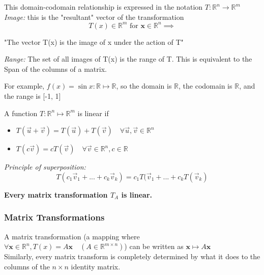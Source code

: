 \documentclass[12pt]{article} %
\newcommand{\R}{\mathbb{R}}
\begin{document}
This domain-codomain relationship is expressed in the notation $T: \R^n \to \R^m$\\

\emph{Image:} this is the "resultant" vector of the transformation 
$$T(x)\in \R^m \text{ for } \mathbf{x}\in \R^n \implies$$
\begin{center}
 "The vector T(x) is the image of x under the action of T"
\end{center}

\emph{Range:} The set of all images of T(x) is the range of T. This is equivalent to the Span of the columns of a matrix.

For example, $f(x) = \sin x : \R \mapsto \R$, so the domain is $\R$, the codomain is $\R$, and the range is [-1, 1]

A function $T : \R^n \mapsto \R^m$ is linear if
\begin{itemize}
	\item $T(\vec{u} + \vec{v}) = T(\vec{u}) + T(\vec{v}) \quad \forall \vec{u}, \vec{v} \in \R^n$
	\item $T(c\vec{v}) = cT(\vec{v}) \quad \forall \vec{v} \in \R^n, c \in \R$
\end{itemize}

\emph{Principle of superposition:}
$$T(c_1 \vec{v}_1 + ... + c_k \vec{v}_k) = c_1 T(\vec{v}_1 + ... + c_k T(\vec{v}_k)$$

\textbf{Every matrix transformation $T_A$ is linear.}

\subsubsection{Matrix Transformations}
A matrix transformation (a mapping where $\forall \mathbf{x} \in \R^n, T(x) =  A\mathbf{x} \quad (A \in \R^{m \times n})$) can be written as $\mathbf{x} \mapsto A\mathbf{x}$\\
Similarly, every matrix transform is completely determined by what it does to the columns of the $n\times n$ identity matrix.
\end{document}
